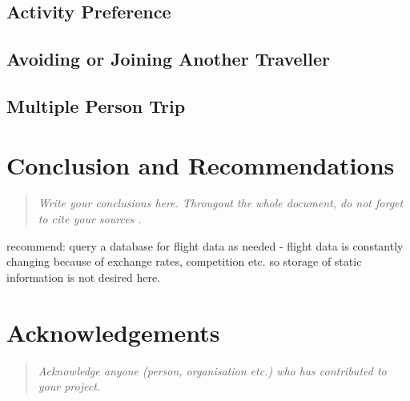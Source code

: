 \documentclass[12pt]{article}
\begin{document}
\subsection{Activity Preference}


\subsection{Avoiding or Joining Another Traveller}


\subsection{Multiple Person Trip}




\pagebreak

\section{Conclusion and Recommendations}
\label{sec:conc}


\begin{quote} \textit{
Write your conclusions here. Througout the whole document, do not forget to cite your sources \cite{example}.
} \end{quote}


recommend: query a database for flight data as needed - flight data is constantly changing because of exchange rates, competition etc. so storage of static information is not desired here.


\pagebreak

\section{Acknowledgements}
\label{sec:acknow}


\begin{quote} \textit{
Acknowledge anyone (person, organisation etc.) who has contributed to your project.
} \end{quote}
\end{document}
